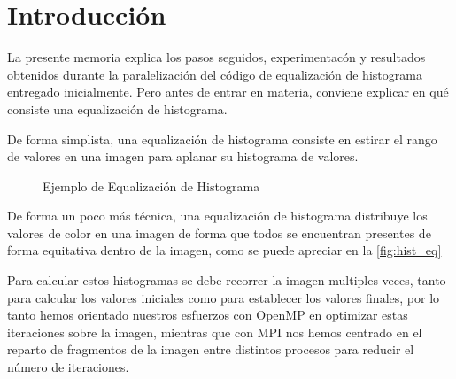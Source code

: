 \documentclass[12pt]{report} %
\begin{document}
\listoffigures
\thispagestyle{fancy}

\listoftables
\thispagestyle{fancy}

\clearpage
{} %

\chapter{Introducción}
\label{chap:Intro}

La presente memoria explica los pasos seguidos, experimentacón y resultados obtenidos durante la
paralelización del código de equalización de histograma entregado inicialmente. Pero antes de entrar
en materia, conviene explicar en qué consiste una equalización de histograma.

De forma simplista, una equalización de histograma consiste en estirar el rango de valores en una
imagen para aplanar su histograma de valores.

\begin{figure}[H]
    \caption{Ejemplo de Equalización de Histograma}
    \label{fig:hist_eq}
\end{figure}

De forma un poco más técnica, una equalización de histograma distribuye los valores de color en una imagen de
forma que todos se encuentran presentes de forma equitativa dentro de la imagen, como se puede apreciar
en la \autoref{fig:hist_eq}

Para calcular estos histogramas se debe recorrer la imagen multiples veces, tanto para
calcular los valores iniciales como para establecer los valores finales, por lo tanto hemos orientado
nuestros esfuerzos con OpenMP \parencite{openmp_openmp_2004} en optimizar estas iteraciones sobre
la imagen, mientras que con MPI \parencite{spi-inc_open_2004} nos hemos centrado en el reparto
de fragmentos de la imagen entre distintos procesos para reducir el número de iteraciones.
\end{document}

